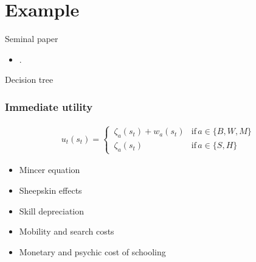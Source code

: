 \section{Example}
\begin{frame}{Seminal paper}\vspace{0.25cm}
\begin{itemize}
	\item {}.
\end{itemize}
\end{frame}
\begin{frame}{Decision tree}
\begin{figure}
  \scalebox{0.60}{}
\end{figure}
\end{frame}
\begin{frame}\frametitle{Immediate utility}\vspace{0.3cm}

  \begin{multicols}{2}

  \begin{align*}
  u_t(s_t) =
  \begin{cases}
      \,\zeta_a(s_t)  + w_a(s_t)   & \text{if}\, a \in \{B, W, M\}  \\[0.2cm]
      \,\zeta_a(s_t)                 &  \text{if}\, a \in \{S, H\}
  \end{cases}
  \end{align*}

  \columnbreak


  \vspace{0.3cm}
  \begin{itemize}\setlength\itemsep{1em}
     \item Mincer equation
     \item Sheepskin effects
     \item Skill depreciation
     \item Mobility and search costs
     \item Monetary and psychic cost of schooling
  \end{itemize}

\end{multicols}

\end{frame}
